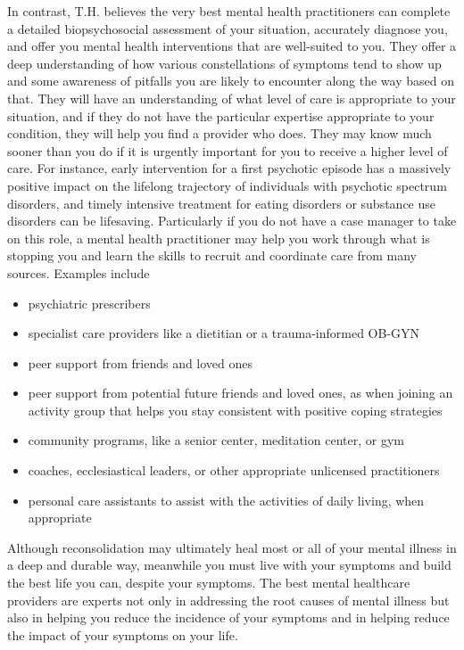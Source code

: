 \documentclass[11pt,oneside]{book}
\begin{document}
In contrast, T.H. believes the very best mental health practitioners can complete a detailed biopsychosocial assessment of your situation, accurately diagnose you, and offer you mental health interventions that are well-suited to you. They offer a deep understanding of how various constellations of symptoms tend to show up and some awareness of pitfalls you are likely to encounter along the way based on that. They will have an understanding of what level of care is appropriate to your situation, and if they do not have the particular expertise appropriate to your condition, they will help you find a provider who does. They may know much sooner than you do if it is urgently important for you to receive a higher level of care. For instance, early intervention for a first psychotic episode has a massively positive impact on the lifelong trajectory of individuals with psychotic spectrum disorders, and timely intensive treatment for eating disorders or substance use disorders can be lifesaving. Particularly if you do not have a case manager to take on this role, a mental health practitioner may help you work through what is stopping you and learn the skills to recruit and coordinate care from many sources. Examples include
\begin{itemize}
    \item psychiatric prescribers
    \item specialist care providers like a dietitian or a trauma-informed OB-GYN
    \item peer support from friends and loved ones
    \item peer support from potential future friends and loved ones, as when joining an activity group that helps you stay consistent with positive coping strategies
    \item community programs, like a senior center, meditation center, or gym
    \item coaches, ecclesiastical leaders, or other appropriate unlicensed practitioners
    \item personal care assistants to assist with the activities of daily living, when appropriate
\end{itemize}

Although reconsolidation may ultimately heal most or all of your mental illness in a deep and durable way, meanwhile you must live with your symptoms and build the best life you can, despite your symptoms. The best mental healthcare providers are experts not only in addressing the root causes of mental illness but also in helping you reduce the incidence of your symptoms and in helping reduce the impact of your symptoms on your life.
\end{document}
